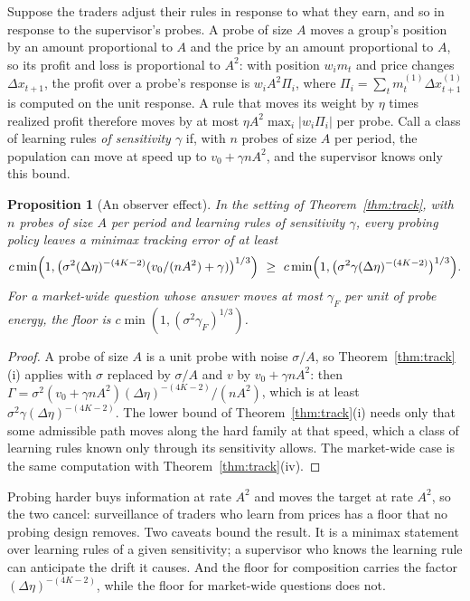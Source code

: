 \documentclass[12pt]{article}
\newtheorem{proposition}[theorem]{Proposition}
\theoremstyle{definition}
\theoremstyle{remark}
\begin{document}
Suppose the traders adjust their rules in response to what they earn, and so in response to the supervisor's probes. A probe of size $A$ moves a group's position by an amount proportional to $A$ and the price by an amount proportional to $A$, so its profit and loss is proportional to $A^2$: with position $w_im_t$ and price changes $\Delta x_{t+1}$, the profit over a probe's response is $w_iA^2\Pi_i$, where $\Pi_i=\sum_tm_t^{(1)}\Delta x_{t+1}^{(1)}$ is computed on the unit response. A rule that moves its weight by $\eta$ times realized profit therefore moves by at most $\eta A^2\max_i|w_i\Pi_i|$ per probe. Call a class of learning rules \emph{of sensitivity $\gamma$} if, with $n$ probes of size $A$ per period, the population can move at speed up to $v_0+\gamma nA^2$, and the supervisor knows only this bound.

\begin{proposition}[An observer effect]\label{prop:observer}
In the setting of Theorem~\ref{thm:track}, with $n$ probes of size $A$ per period and learning rules of sensitivity $\gamma$, every probing policy leaves a minimax tracking error of at least
\[
 c\min\Bigl(1,\bigl(\sigma^2(\Delta\eta)^{-(4K-2)}(v_0/(nA^2)+\gamma)\bigr)^{1/3}\Bigr)\ \ge\ c\min\Bigl(1,\bigl(\sigma^2\gamma(\Delta\eta)^{-(4K-2)}\bigr)^{1/3}\Bigr).
\]
For a market-wide question whose answer moves at most $\gamma_F$ per unit of probe energy, the floor is $c\min(1,(\sigma^2\gamma_F)^{1/3})$.
\end{proposition}

\begin{proof}
A probe of size $A$ is a unit probe with noise $\sigma/A$, so Theorem~\ref{thm:track}(i) applies with $\sigma$ replaced by $\sigma/A$ and $v$ by $v_0+\gamma nA^2$: then $\Gamma=\sigma^2(v_0+\gamma nA^2)(\Delta\eta)^{-(4K-2)}/(nA^2)$, which is at least $\sigma^2\gamma(\Delta\eta)^{-(4K-2)}$. The lower bound of Theorem~\ref{thm:track}(i) needs only that some admissible path moves along the hard family at that speed, which a class of learning rules known only through its sensitivity allows. The market-wide case is the same computation with Theorem~\ref{thm:track}(iv).
\end{proof}

Probing harder buys information at rate $A^2$ and moves the target at rate $A^2$, so the two cancel: surveillance of traders who learn from prices has a floor that no probing design removes. Two caveats bound the result. It is a minimax statement over learning rules of a given sensitivity; a supervisor who knows the learning rule can anticipate the drift it causes. And the floor for composition carries the factor $(\Delta\eta)^{-(4K-2)}$, while the floor for market-wide questions does not.
\end{document}
